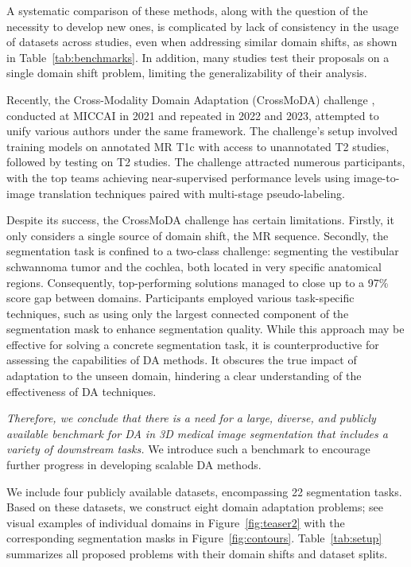 A systematic comparison of these methods, along with the question of the necessity to develop new ones, is complicated by lack of consistency in the usage of datasets across studies, even when addressing similar domain shifts, as shown in Table~\ref{tab:benchmarks}. In addition, many studies test their proposals on a single domain shift problem, limiting the generalizability of their analysis.  

Recently, the Cross-Modality Domain Adaptation (CrossMoDA) challenge \cite{crossmoda}, conducted at MICCAI in 2021 and repeated in 2022 and 2023, attempted to unify various authors under the same framework. The challenge's setup involved training models on annotated MR T1c with access to unannotated T2 studies, followed by testing on T2 studies. The challenge attracted numerous participants, with the top teams achieving near-supervised performance levels using image-to-image translation techniques paired with multi-stage pseudo-labeling.

Despite its success, the CrossMoDA challenge has certain limitations. Firstly, it only considers a single source of domain shift, the MR sequence. Secondly, the segmentation task is confined to a two-class challenge: segmenting the vestibular schwannoma tumor and the cochlea, both located in very specific anatomical regions. Consequently, top-performing solutions managed to close up to a 97\% score gap between domains. Participants employed various task-specific techniques, such as using only the largest connected component of the segmentation mask to enhance segmentation quality. While this approach may be effective for solving a concrete segmentation task, it is counterproductive for assessing the capabilities of DA methods. It obscures the true impact of adaptation to the unseen domain, hindering a clear understanding of the effectiveness of DA techniques.

\textit{Therefore, we conclude that there is a need for a large, diverse, and publicly available benchmark for DA in 3D medical image segmentation that includes a variety of downstream tasks.} We introduce such a benchmark to encourage further progress in developing scalable DA methods.

We include four publicly available datasets, encompassing 22 segmentation tasks. Based on these datasets, we construct eight domain adaptation problems; see visual examples of individual domains in Figure~\ref{fig:teaser2} with the corresponding segmentation masks in Figure~\ref{fig:contours}. Table~\ref{tab:setup} summarizes all proposed problems with their domain shifts and dataset splits.

